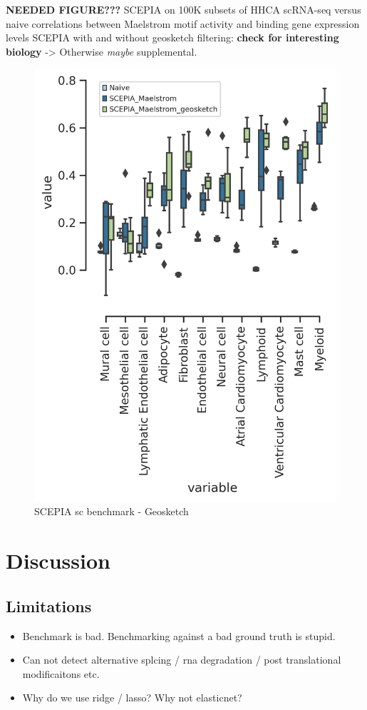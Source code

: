 \textbf{NEEDED FIGURE???}
SCEPIA on 100K subsets of HHCA scRNA-seq versus naive correlations between Maelstrom motif activity and binding gene expression levels
SCEPIA with and without geosketch filtering: \textbf{check for interesting biology} -> Otherwise \textit{maybe} supplemental.
\begin{figure}
    \centering
    \includegraphics[width=0.75\linewidth]{ch.scepia/imgs/CorrelationsGeosketch_perCT.png}
    \caption{SCEPIA sc benchmark - Geosketch}
    \label{fig:sc_benchmark}
\end{figure}

\section{Discussion}

\subsection{Limitations}
\begin{itemize}
    \item Benchmark is bad. Benchmarking against a bad ground truth is stupid.
    \item Can not detect alternative splcing / rna degradation / post translational modificaitons etc.
    \item Why do we use ridge / lasso? Why not elasticnet?
\end{itemize}

